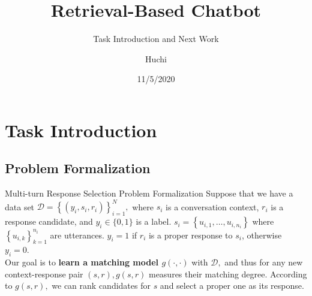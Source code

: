 \documentclass{beamer}
\author{Huchi}
\title{Retrieval-Based Chatbot}
\subtitle{Task Introduction and Next Work}
\institute{Natural Language Processing Research Group \\  Nanjing University}
\date{11/5/2020}
\begin{document}
\kaishu
\begin{frame}
    \titlepage
    \begin{figure}[htpb]
        \begin{center}
        \end{center}
    \end{figure}
\end{frame}

\begin{frame}
    \tableofcontents[sectionstyle=show,subsectionstyle=show/shaded/hide,subsubsectionstyle=show/shaded/hide]
\end{frame}


\section{Task Introduction}


\subsection{Problem Formalization}
\begin{frame} {Multi-turn Response Selection Problem Formalization}
Suppose that we have a data set $\mathcal{D}=\left\{\left(y_{i}, s_{i}, r_{i}\right)\right\}_{i=1}^{N},$ where $s_{i}$ is a conversation context, $r_{i}$ is a response candidate, and $y_{i} \in\{0,1\}$ is a label. $s_{i}=\left\{u_{i, 1}, \ldots, u_{i, n_{i}}\right\}$ where $\left\{u_{i, k}\right\}_{k=1}^{n_{i}}$ are utterances. $y_{i}=1$ if $r_{i}$ is a proper response to $s_{i}$, otherwise $y_{i}=0 .$ 
\\
Our goal is to \textbf{learn a matching model $g(\cdot, \cdot)$} with $\mathcal{D},$ and thus for any new context-response pair $(s, r), g(s, r)$ measures their matching degree. According to $g(s, r),$ we can rank candidates for $s$ and select a proper one as its response.
\end{frame}
\end{document}
